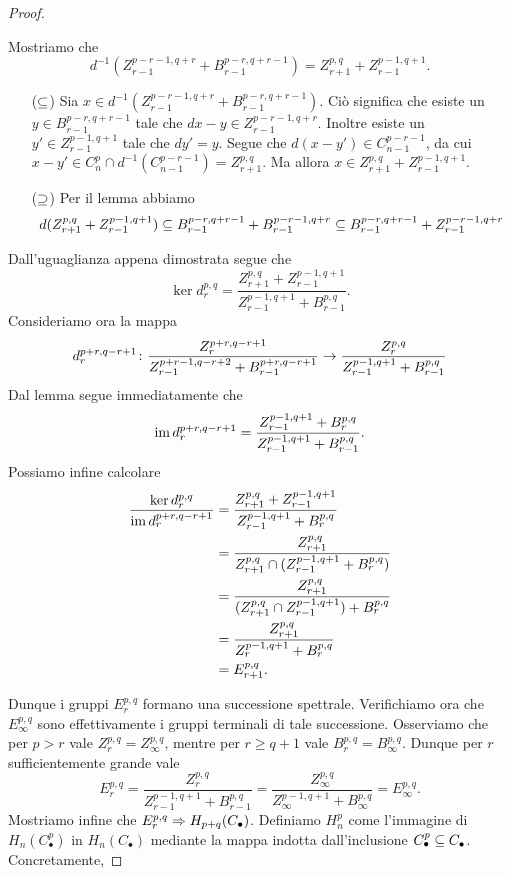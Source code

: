 \begin{proof}
\begin{enumerate}
$$$$
Mostriamo che 
$$
d^{-1}(Z^{p-r-1,q+r}_{r-1}+B^{p-r,q+r-1}_{r-1})=Z^{p,q}_{r+1}+Z^{p-1,q+1}_{r-1}.
$$
\begin{itemize}
\item[($\subseteq$)] Sia $x\in d^{-1}(Z^{p-r-1,q+r}_{r-1}+B^{p-r,q+r-1}_{r-1})$. Ciò significa che esiste un $y\in B^{p-r,q+r-1}_{r-1}$ tale che $dx-y\in Z^{p-r-1,q+r}_{r-1}$. Inoltre esiste un $y'\in Z^{p-1,q+1}_{r-1}$ tale che $dy'=y$. Segue che $d(x-y')\in C^{p-r-1}_{n-1}$, da cui $x-y'\in C^p_n\cap d^{-1}(C^{p-r-1}_{n-1})=Z^{p,q}_{r+1}$. Ma allora $x\in Z^{p,q}_{r+1}+Z^{p-1,q+1}_{r-1}$.
\item[($\supseteq$)] Per il lemma abbiamo
$$
d(Z^{p,q}_{r+1}+Z^{p-1,q+1}_{r-1})\subseteq B^{p-r,q+r-1}_{r-1}+B^{p-r-1,q+r}_{r-1}\subseteq B^{p-r,q+r-1}_{r-1}+Z^{p-r-1,q+r}_{r-1}
$$
\end{itemize}
Dall'uguaglianza appena dimostrata segue che
$$
\ker d^{p,q}_r=\frac{Z^{p,q}_{r+1}+Z^{p-1,q+1}_{r-1}}{Z^{p-1,q+1}_{r-1}+B^{p,q}_{r-1}}.
$$
Consideriamo ora la mappa
$$
d^{p+r,q-r+1}_r\colon\frac{Z^{p+r,q-r+1}_r}{Z^{p+r-1,q-r+2}_{r-1}+B^{p+r,q-r+1}_{r-1}}\to\frac{Z^{p,q}_r}{Z^{p-1,q+1}_{r-1}+B^{p,q}_{r-1}}
$$
Dal lemma segue immediatamente che
$$
\operatorname{im} d^{p+r,q-r+1}_r=\frac{Z^{p-1,q+1}_{r-1}+B^{p,q}_r}{Z^{p-1,q+1}_{r-1}+B^{p,q}_{r-1}}.
$$
Possiamo infine calcolare
\begin{align*}
\frac{\ker d^{p,q}_r}{\operatorname{im} d^{p+r,q-r+1}_r}&=\frac{Z^{p,q}_{r+1}+Z^{p-1,q+1}_{r-1}}{Z^{p-1,q+1}_{r-1}+B^{p,q}_r}\\
&=\frac{Z^{p,q}_{r+1}}{Z^{p,q}_{r+1}\cap(Z^{p-1,q+1}_{r-1}+B^{p,q}_r)}\\
&=\frac{Z^{p,q}_{r+1}}{(Z^{p,q}_{r+1}\cap Z^{p-1,q+1}_{r-1})+B^{p,q}_r}\\
&=\frac{Z^{p,q}_{r+1}}{Z^{p-1,q+1}_r+B^{p,q}_r}\\
&=E^{p,q}_{r+1}.
\end{align*}
\end{enumerate}
Dunque i gruppi $E^{p,q}_r$ formano una successione spettrale. Verifichiamo ora che $E^{p,q}_\infty$ sono effettivamente i gruppi terminali di tale successione. Osserviamo che per $p>r$ vale $Z^{p,q}_r=Z^{p,q}_\infty$, mentre per $r\ge q+1$ vale $B^{p,q}_r=B^{p,q}_\infty$. Dunque per $r$ sufficientemente grande vale
$$
E^{p,q}_r=\frac{Z^{p,q}_r}{Z^{p-1,q+1}_{r-1}+B^{p,q}_{r-1}}=\frac{Z^{p,q}_\infty}{Z^{p-1,q+1}_{\infty}+B^{p,q}_\infty}=E^{p,q}_\infty.
$$
Mostriamo infine che $E^{p,q}_r\Rightarrow H_{p+q}(C_\bullet)$. Definiamo $H^p_n$ come l'immagine di $H_n(C^p_\bullet)$ in $H_n(C_\bullet)$ mediante la mappa indotta dall'inclusione $C^p_\bullet\subseteq C_\bullet$. Concretamente,

\end{proof}
